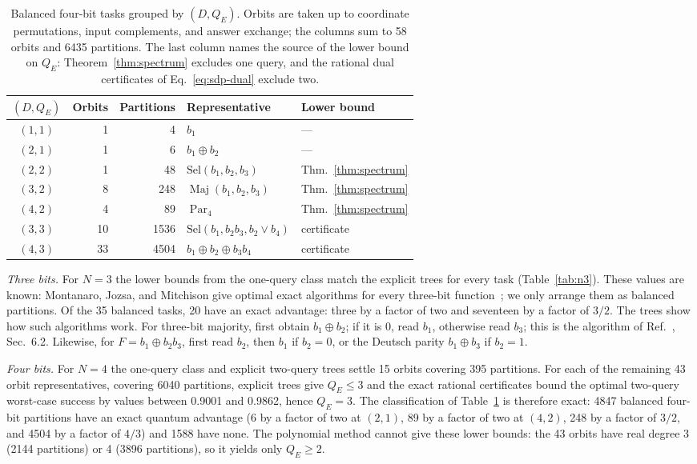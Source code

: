 \documentclass[
  aps,
  pra,
  reprint,
  nofootinbib
]{revtex4-2}
\begin{document}
\begin{table}[t]
\caption{Balanced four-bit tasks grouped by \((D,Q_E)\). Orbits are taken up
to coordinate permutations, input complements, and answer exchange; the
columns sum to 58 orbits and 6435 partitions. The last column names the source
of the lower bound on \(Q_E\): Theorem~\ref{thm:spectrum} excludes one
query, and the rational dual certificates of Eq.~\eqref{eq:sdp-dual} exclude
two.}
\label{tab:n4}
\begin{ruledtabular}
\begin{tabular}{crrll}
\((D,Q_E)\) & Orbits & Partitions & Representative & Lower bound\\
\hline
\((1,1)\) & 1 & 4 & \(b_1\) & ---\\
\((2,1)\) & 1 & 6 & \(b_1\oplus b_2\) & ---\\
\((2,2)\) & 1 & 48 & \(\mathrm{Sel}(b_1,b_2,b_3)\) & Thm.~\ref{thm:spectrum}\\
\((3,2)\) & 8 & 248 & \(\operatorname{Maj}(b_1,b_2,b_3)\) & Thm.~\ref{thm:spectrum}\\
\((4,2)\) & 4 & 89 & \(\operatorname{Par}_4\) & Thm.~\ref{thm:spectrum}\\
\((3,3)\) & 10 & 1536 & \(\mathrm{Sel}(b_1,b_2b_3,b_2\lor b_4)\) & certificate\\
\((4,3)\) & 33 & 4504 & \(b_1\oplus b_2\oplus b_3b_4\) & certificate\\
\end{tabular}
\end{ruledtabular}
\end{table}

\emph{Three bits.} For \(N=3\) the lower bounds from the one-query class match
the explicit trees for every task (Table~\ref{tab:n3}). These values are known:
Montanaro, Jozsa, and Mitchison give optimal exact algorithms for every
three-bit function~\cite{MontanaroJozsaMitchison2015}; we only arrange them as
balanced partitions. Of the 35 balanced tasks, 20 have an exact advantage:
three by a factor of two and seventeen by a factor of \(3/2\). The trees show
how such algorithms work. For three-bit majority, first obtain
\(b_1\oplus b_2\); if it is 0, read \(b_1\), otherwise read \(b_3\); this is
the algorithm of Ref.~\cite{MontanaroJozsaMitchison2015}, Sec.~6.2. Likewise,
for \(F=b_1\oplus b_2b_3\), first read \(b_2\), then \(b_1\) if \(b_2=0\), or
the Deutsch parity \(b_1\oplus b_3\) if \(b_2=1\).

\emph{Four bits.} For \(N=4\) the one-query class and explicit two-query trees
settle 15 orbits covering 395 partitions. For each of the remaining 43 orbit
representatives, covering 6040 partitions, explicit trees give \(Q_E\le3\) and
the exact rational certificates bound the optimal two-query worst-case success
by values between 0.9001 and 0.9862, hence \(Q_E=3\). The classification of Table~\ref{tab:n4} is
therefore exact: 4847 balanced four-bit partitions have an exact quantum
advantage (6 by a factor of two at \((2,1)\), 89 by a factor of two at
\((4,2)\), 248 by a factor of \(3/2\), and 4504 by a factor of \(4/3\)) and
1588 have none. The polynomial method cannot give these lower bounds: the 43
orbits have real degree 3 (2144 partitions) or 4 (3896 partitions), so it
yields only \(Q_E\ge2\).
\end{document}

